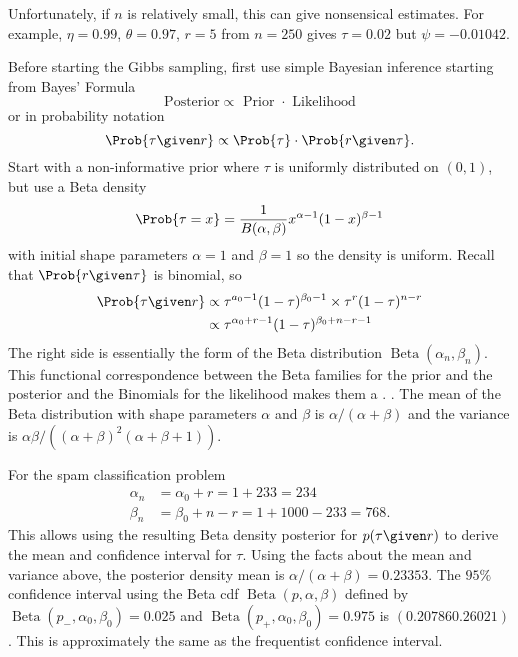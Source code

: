 \documentclass[12pt]{article}
\begin{document}
Unfortunately, if \( n \) is relatively small, this can give nonsensical
estimates.  For example, \( \eta = 0.99 \), \( \theta = 0.97 \), \( r =
5 \) from \( n = 250 \) gives \( \tau = 0.02 \) but \( \psi = -0.01042 \).

Before starting the Gibbs sampling, first use simple
Bayesian inference%
starting from Bayes' Formula%
\[
    \text{ Posterior} \propto \text{ Prior } \cdot \text{ Likelihood }
\] or in probability notation
\[
    \Prob{\tau \given r} \propto \Prob{\tau} \cdot \Prob{r \given \tau}.
\] Start with a non-informative prior where \( \tau \) is uniformly
distributed on \( (0,1) \), but use a Beta density
\[
    \Prob{\tau = x} = \frac{1}{B(\alpha, \beta)} x^{\alpha-1}(1-x)^{\beta-1}
\] with initial shape parameters \( \alpha = 1 \) and \( \beta = 1 \) so
the density is uniform.  Recall that \( \Prob{r \given \tau} \) is
binomial, so
\begin{align*}
    \Prob{\tau \given r} &\propto \tau^{a_0 - 1}(1-\tau)^{\beta_0 - 1}
    \times \tau^r (1 - \tau)^{n-r} \\
    &\propto \tau^{\alpha_0 + r -1} (1-\tau)^{\beta_0 + n - r -1} \\
\end{align*}
The right side is essentially the form of the Beta distribution \(
\operatorname{Beta}
(\alpha_n, \beta_n) \).  This functional correspondence between the Beta
families for the prior and the posterior and the Binomials for the
likelihood makes them a .%
%
.  The mean of the Beta distribution with shape parameters \( \alpha \)
and \( \beta \) is \( \alpha/(\alpha + \beta) \) and the variance is \(
\alpha \beta/((\alpha + \beta)^2(\alpha + \beta + 1)) \).

For the spam classification problem
\begin{align*}
    \alpha_n &= \alpha_0 + r = 1 + 233 = 234 \\
    \beta_n &= \beta_0 + n -r = 1 + 1000 - 233 = 768.
\end{align*}
This allows using the resulting Beta density posterior for \( p(\tau
\given r) \) to derive the mean and confidence interval for \( \tau \).
Using the facts about the mean and variance above, the posterior density
mean is \( \alpha/(\alpha + \beta) = 0.23353 \).  The \( 95\% \)
confidence interval using the Beta cdf \(
\operatorname{Beta}
(p, \alpha, \beta) \) defined by \(
\operatorname{Beta}
(p_{-}, \alpha_0, \beta_0) = 0.025 \) and \(
\operatorname{Beta}
(p_{+}, \alpha_0, \beta_0) = 0.975 \) is \( (0.20786 0.26021) \).  This
is approximately the same as the frequentist confidence interval.
\end{document}
